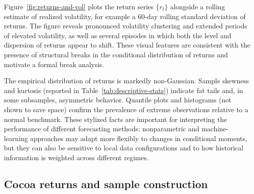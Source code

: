 \documentclass[11pt]{article}
\newcommand{\1}{\mathbf{1}}
\begin{document}
Figure~\ref{fig:returns-and-vol} plots the return series $\{r_t\}$ alongside a rolling estimate of realized volatility, for example a $60$-day rolling standard deviation of returns.
The figure reveals pronounced volatility clustering and extended periods of elevated volatility, as well as several episodes in which both the level and dispersion of returns appear to shift.
These visual features are consistent with the presence of structural breaks in the conditional distribution of returns and motivate a formal break analysis.

The empirical distribution of returns is markedly non-Gaussian.
Sample skewness and kurtosis (reported in Table~\ref{tab:descriptive-stats}) indicate fat tails and, in some subsamples, asymmetric behavior.
Quantile plots and histograms (not shown to save space) confirm the prevalence of extreme observations relative to a normal benchmark.
These stylized facts are important for interpreting the performance of different forecasting methods:
nonparametric and machine-learning approaches may adapt more flexibly to changes in conditional moments, but they can also be sensitive to local data configurations and to how historical information is weighted across different regimes.

%


\subsection{Cocoa returns and sample construction}
\end{document}
